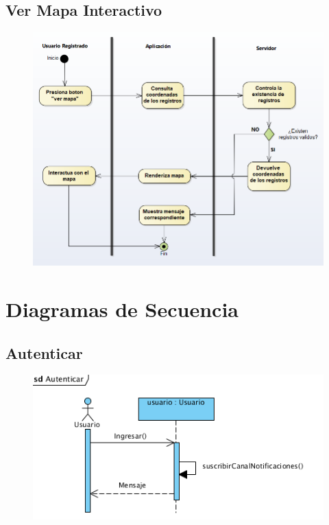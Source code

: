 	\subsection{Ver Mapa Interactivo}

	\begin{figure}[H]
	\centering
		\includegraphics[width=1\textwidth]{imagenes/analisis/diagrama-actividad-ver-mapa.png}
		\label{fig:diagrama-actividad-comprar-producto}
    \end{figure}
    

\section{Diagramas de Secuencia}

\subsection{Autenticar}
\begin{figure}[H]
  \centering
    \includegraphics{imagenes/disenio/secuencia-autenticar.png}
    \label{fig:diagrama-secuencia-autenticar}
\end{figure}


